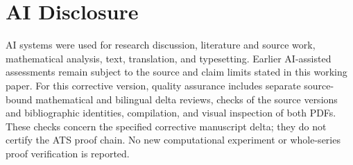 \section*{AI Disclosure}
\noindent
AI systems were used for research discussion, literature and source work,
mathematical analysis, text, translation, and typesetting. Earlier
AI-assisted assessments remain subject to the source and claim limits
stated in this working paper.
\medskip
\noindent
For this corrective version, quality assurance includes separate
source-bound mathematical and bilingual delta reviews, checks of
the source versions and bibliographic identities, compilation,
and visual inspection of both PDFs. These checks concern the
specified corrective manuscript delta; they do not certify the
ATS proof chain. No new computational experiment or whole-series
proof verification is reported.
